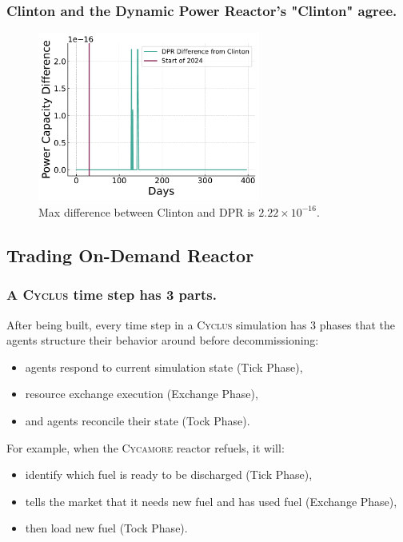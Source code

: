 \documentclass[9pt]{beamer}
\newcommand{\cycamore}{\textsc{Cycamore}\xspace}
\newcommand{\cyclus}{\textsc{Cyclus}\xspace}
\begin{document}

\begin{frame}
  \frametitle{Clinton and the Dynamic Power Reactor's "Clinton" agree.}
  \begin{figure}
    \centering
    \includegraphics[width=0.65\textwidth]{images/dpr_diff.pdf}
    \caption{Max difference between Clinton and DPR is $2.22 \times 10^{-16}$.}
  \end{figure}
\end{frame}


\subsection{Trading On-Demand Reactor}
\begin{frame}
  \frametitle{A \cyclus time step has 3 parts.}
  After being built, every time step in a \cyclus simulation has 3 phases that the agents structure their behavior around before decommissioning:
  \begin{itemize}
    \item agents respond to current simulation state (Tick Phase), \pause
    \item resource exchange execution (Exchange Phase), \pause
    \item and agents reconcile their state (Tock Phase). \pause
  \end{itemize}
  \vspace{5pt}
  For example, when the \cycamore reactor refuels, it will: \pause
  \begin{itemize}[<+->]
    \item identify which fuel is ready to be discharged (Tick Phase),
    \item tells the market that it needs new fuel and has used fuel (Exchange Phase),
    \item then load new fuel (Tock Phase).
  \end{itemize}
\end{frame}
\end{document}
